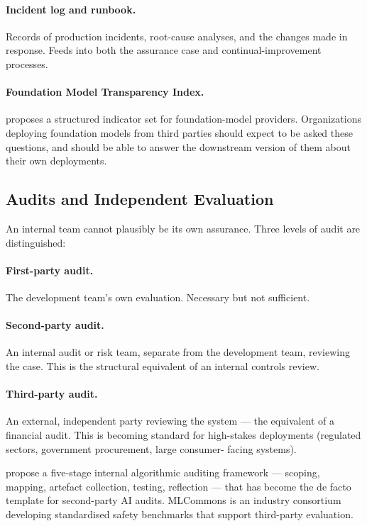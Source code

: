 \paragraph{Incident log and runbook.} Records of production
incidents, root-cause analyses, and the changes made in response.
Feeds into both the assurance case and continual-improvement
processes.

\paragraph{Foundation Model Transparency Index.}
\citet{bommasani2023transparency} proposes a structured
indicator set for foundation-model providers. Organizations
deploying foundation models from third parties should expect to
be asked these questions, and should be able to answer the
downstream version of them about their own deployments.

\subsection{Audits and Independent Evaluation}

An internal team cannot plausibly be its own assurance. Three
levels of audit are distinguished:

\paragraph{First-party audit.} The development team's own
evaluation. Necessary but not sufficient.

\paragraph{Second-party audit.} An internal audit or risk team,
separate from the development team, reviewing the case. This is
the structural equivalent of an internal controls review.

\paragraph{Third-party audit.} An external, independent party
reviewing the system --- the equivalent of a financial audit.
This is becoming standard for high-stakes deployments
(regulated sectors, government procurement, large consumer-
facing systems).

\citet{raji2020closing} propose a five-stage internal
algorithmic auditing framework --- scoping, mapping, artefact
collection, testing, reflection --- that has become the
de facto template for second-party AI audits. MLCommons
\citep{mlcommons_ailuminate} is an industry consortium
developing standardised safety benchmarks that support
third-party evaluation.

